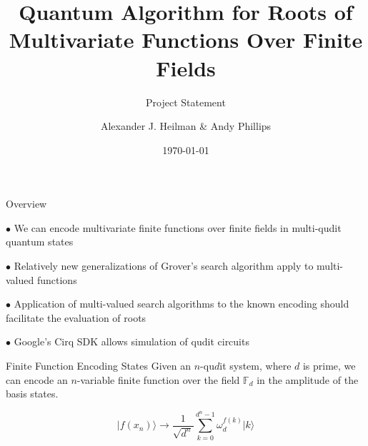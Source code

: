 \documentclass[xcolor=dvipsnames]{beamer}
\title[Title]
{
 Quantum Algorithm for Roots of Multivariate Functions Over
 Finite Fields
}
\subtitle{Project Statement}
\author{ Alexander J. Heilman \& Andy Phillips }
\date{\today} %
\begin{document}
\begin{frame}
    \titlepage
\end{frame}

\begin{frame}{Overview}

$\bullet$ We can encode multivariate finite functions over
          finite fields in multi-qudit quantum 
          states \cite{appel2020}
          
\medskip\pause         
          
$\bullet$ Relatively new generalizations of Grover's search
          algorithm apply to multi-valued 
          functions \cite{hunt2020}\cite{fan2008}
          
\medskip\pause          
          
$\bullet$ Application of multi-valued search algorithms to 
          the known encoding should facilitate the evaluation 
          of roots
          
\medskip\pause

$\bullet$ Google's Cirq SDK allows simulation of qudit
          circuits

\end{frame}



\begin{frame}{Finite Function Encoding States}
Given an $n$-qu$d$it system, where $d$ is prime, we can encode an
$n$-variable finite function over the field $\mathbb{F}_d$ in the amplitude of the basis states.

$$
\vert f(x_n) \rangle \rightarrow \frac{1}{\sqrt{d^n}}\sum_{k=0}^{d^n-1} \omega_d^{f(k)}\vert k\rangle
$$
\end{frame}
\end{document}
